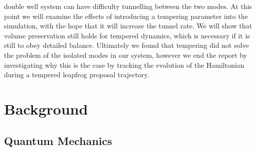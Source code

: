 \documentclass[12pt]{article}
\begin{document}
double well system can have difficulty tunnelling between the two modes. At this point we will examine the effects of introducing a tempering parameter into the simulation, with the hope that it will increase the tunnel rate. We will show that volume preservation still holds for tempered dynamics, which is necessary if it is still to obey detailed balance. Ultimately we found that tempering did not solve the problem of the isolated modes in our system, however we end the report by investigating why this is the case by tracking the evolution of the Hamiltonian during a tempered leapfrog proposal trajectory.


\section{Background}
    \subsection{Quantum Mechanics}
\end{document}
